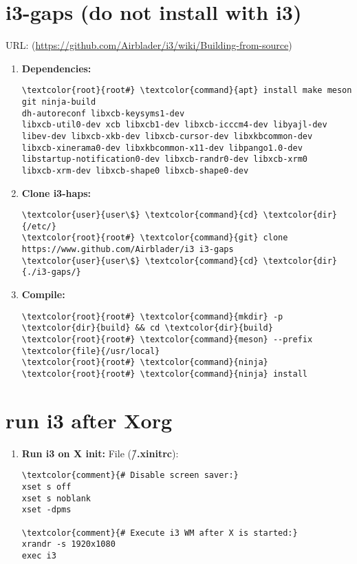 \documentclass[10pt, a4paper, onecolumn, openany]{book} %
\begin{document}
\section{i3-gaps (do not install with i3)}
URL: (\underline{https://github.com/Airblader/i3/wiki/Building-from-source})
\begin{enumerate}
    \item \textbf{Dependencies:}
\begin{Verbatim}[commandchars=\\\{\}]
\textcolor{root}{root#} \textcolor{command}{apt} install make meson git ninja-build
dh-autoreconf libxcb-keysyms1-dev
libxcb-util0-dev xcb libxcb1-dev libxcb-icccm4-dev libyajl-dev
libev-dev libxcb-xkb-dev libxcb-cursor-dev libxkbcommon-dev 
libxcb-xinerama0-dev libxkbcommon-x11-dev libpango1.0-dev
libstartup-notification0-dev libxcb-randr0-dev libxcb-xrm0 
libxcb-xrm-dev libxcb-shape0 libxcb-shape0-dev
\end{Verbatim} 
    \item \textbf{Clone i3-haps:}
\begin{Verbatim}[commandchars=\\\{\}]
\textcolor{user}{user\$} \textcolor{command}{cd} \textcolor{dir}{/etc/}
\textcolor{root}{root#} \textcolor{command}{git} clone https://www.github.com/Airblader/i3 i3-gaps
\textcolor{user}{user\$} \textcolor{command}{cd} \textcolor{dir}{./i3-gaps/}
\end{Verbatim}
    \item \textbf{Compile:}
\begin{Verbatim}[commandchars=\\\{\}]
\textcolor{root}{root#} \textcolor{command}{mkdir} -p \textcolor{dir}{build} && cd \textcolor{dir}{build}
\textcolor{root}{root#} \textcolor{command}{meson} --prefix \textcolor{file}{/usr/local}
\textcolor{root}{root#} \textcolor{command}{ninja}
\textcolor{root}{root#} \textcolor{command}{ninja} install
\end{Verbatim}
\end{enumerate}
\section{run i3 after Xorg}
\begin{enumerate}
    \item \textbf{Run i3 on X init:}
\newline File (\textbf{\textcolor{file}{\~/.xinitrc}}):
\begin{Verbatim}[commandchars=\\\{\}]
\textcolor{comment}{# Disable screen saver:}
xset s off
xset s noblank
xset -dpms

\textcolor{comment}{# Execute i3 WM after X is started:}
xrandr -s 1920x1080
exec i3
\end{Verbatim}
\end{enumerate}
\end{document}
